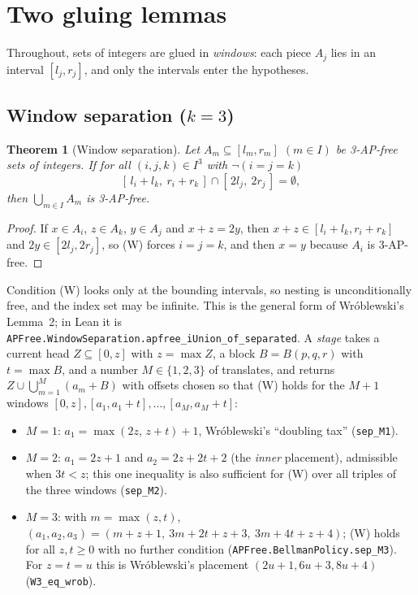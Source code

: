 \documentclass[11pt,a4paper]{article}
\newtheorem{theorem}{Theorem}[section]
\theoremstyle{definition}
\theoremstyle{remark}
\newcommand{\Blk}{B}
\newcommand{\code}[1]{\texttt{#1}}
\begin{document}
\section{Two gluing lemmas}\label{sec:gluing}

Throughout, sets of integers are glued in \emph{windows}: each piece $A_j$ lies in an interval $[l_j, r_j]$, and only the intervals enter the hypotheses.

\subsection{Window separation (\texorpdfstring{$k = 3$}{k = 3})}\label{sec:window}

\begin{theorem}[Window separation]\label{thm:W}
Let $A_m\subseteq[l_m,r_m]$ $(m\in I)$ be 3-AP-free sets of integers. If for all $(i,j,k)\in I^3$ with $\neg(i=j=k)$
\[
[\,l_i+l_k,\ r_i+r_k\,]\cap[\,2l_j,\ 2r_j\,]=\emptyset ,
\tag{W}
\]
then $\bigcup_{m\in I}A_m$ is 3-AP-free.
\end{theorem}

\begin{proof}
If $x\in A_i$, $z\in A_k$, $y\in A_j$ and $x+z=2y$, then $x+z\in[l_i+l_k,r_i+r_k]$ and $2y\in[2l_j,2r_j]$, so (W) forces $i=j=k$, and then $x=y$ because $A_i$ is 3-AP-free.
\end{proof}

Condition (W) looks only at the bounding intervals, so nesting is unconditionally free, and the index set may be infinite. This is the general form of Wr\'oblewski's Lemma~2; in Lean it is \code{APFree.\allowbreak{}WindowSeparation.\allowbreak{}apfree\_\allowbreak{}iUnion\_\allowbreak{}of\_\allowbreak{}separated}. A \emph{stage} takes a current head $Z \subseteq [0,z]$ with $z = \max Z$, a block $\Blk = \Blk(p,q,r)$ with $t = \max \Blk$, and a number $M \in \{1,2,3\}$ of translates, and returns $Z \cup \bigcup_{m=1}^M (a_m + \Blk)$ with offsets chosen so that (W) holds for the $M+1$ windows $[0,z], [a_1, a_1+t], \dots, [a_M, a_M+t]$:

\begin{itemize}
\item $M=1$: $a_1=\max(2z,\,z+t)+1$, Wr\'oblewski's ``doubling tax'' (\code{sep\_\allowbreak{}M1}).
\item $M=2$: $a_1 = 2z+1$ and $a_2 = 2z+2t+2$ (the \emph{inner} placement), admissible when $3t < z$; this one inequality is also sufficient for (W) over all triples of the three windows (\code{sep\_\allowbreak{}M2}).
\item $M=3$: with $m=\max(z,t)$, $(a_1,a_2,a_3)=(m+z+1,\ 3m+2t+z+3,\ 3m+4t+z+4)$; (W) holds for all $z,t\ge0$ with no further condition (\code{APFree.\allowbreak{}BellmanPolicy.\allowbreak{}sep\_\allowbreak{}M3}). For $z=t=u$ this is Wr\'oblewski's placement $(2u+1, 6u+3, 8u+4)$ (\code{W3\_\allowbreak{}eq\_\allowbreak{}wrob}).
\end{itemize}
\end{document}

